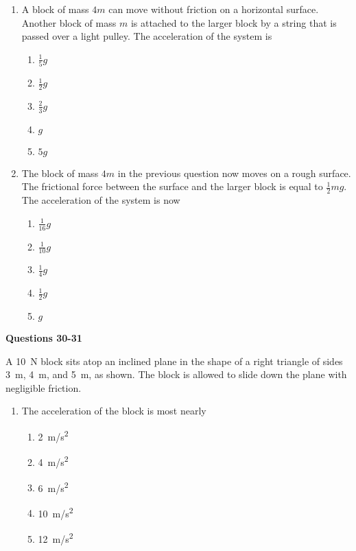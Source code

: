 \documentclass{../../oss-apphys}
\begin{document}
\begin{multicols}{2}
\begin{enumerate}[resume,leftmargin=18pt]
  \item A block of mass $4m$ can move without friction on a horizontal surface.
    Another block of mass $m$ is attached to the larger block by a string that
    is passed over a light pulley. The acceleration of the system is

    \vspace{-.2in}
    \begin{enumerate}[noitemsep,topsep=0pt,leftmargin=18pt,label=(\Alph*)]
    \item $\displaystyle\frac{1}{5} g$
    \item $\displaystyle\frac{1}{2} g$
    \item $\displaystyle\frac{2}{3} g$
    \item $g$
    \item $5g$
    \end{enumerate}

  \item The block of mass $4m$ in the previous question now moves on a rough
    surface. The frictional force between the surface and the larger block is
    equal to $\frac{1}{2}mg$. The acceleration of the system is now
    \begin{enumerate}[noitemsep,topsep=0pt,leftmargin=18pt,label=(\Alph*)]
    \item $\frac{1}{16}g$
    \item $\frac{1}{10}g$
    \item $\frac{1}{4}g$
    \item $\frac{1}{2}g$
    \item $g$
    \end{enumerate}
  \end{enumerate}
  \columnbreak
  
  \textbf{Questions 30-31}

  A \SI{10}{\newton} block sits atop an inclined plane in the shape of a
  right triangle of sides \SI{3}{\metre}, \SI{4}{\metre}, and \SI{5}{\metre},
  as shown. The block is allowed to slide down the plane with negligible
  friction.
  \vspace{-.2in}
  
  \begin{enumerate}[resume,leftmargin=18pt]
  \item The acceleration of the block is most nearly
    \begin{enumerate}[noitemsep,topsep=0pt,leftmargin=18pt,label=(\Alph*)]
    \item\SI{2}{m/s^2}
    \item\SI{4}{m/s^2}
    \item\SI{6}{m/s^2}
    \item\SI{10}{m/s^2}
    \item\SI{12}{m/s^2}
    \end{enumerate}


\end{enumerate}
\end{multicols}
\end{document}
